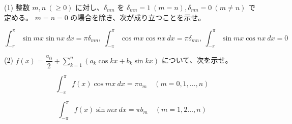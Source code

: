 \documentclass[a4j]{jsarticle}
\begin{document}
    (1) \quad 整数 $m, n \: (\geq 0)$ に対し、$\delta_{mn}$ を $\delta_{mn} = 1 \: (m = n), \delta_{mn} = 0 \: (m \neq n)$ で定める。
    $m = n = 0$ の場合を除き、次が成り立つことを示せ。

    \begin{equation*}
        \int_{-\pi}^{\pi} \sin mx \sin nx \: dx = \pi \delta_{mn}, \: \int_{-\pi}^{\pi} \cos mx \cos nx \: dx = \pi \delta_{mn}, \: \int_{-\pi}^{\pi} \sin mx \cos nx \: dx = 0
    \end{equation*}


    (2) \quad $\displaystyle f(x) = \dfrac{a_0}{2} + \sum_{k = 1}^{n} \left(a_k \cos kx + b_k \sin kx\right)$ について、次を示せ。

    \begin{equation*}
        \int_{-\pi}^{\pi} f(x) \cos mx \: dx = \pi a_m \quad (m = 0, 1, \dots, n)
    \end{equation*}

    \begin{equation*}
        \int_{-\pi}^{\pi} f(x) \sin mx \: dx = \pi b_m \quad (m = 1, 2 \dots, n)
    \end{equation*}
\end{document}
